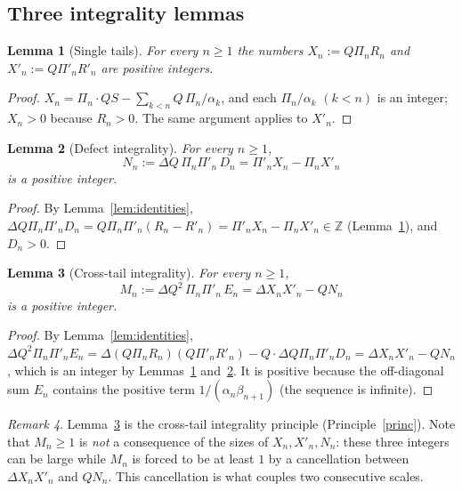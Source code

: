 \documentclass[11pt]{amsart}
\newtheorem{lemma}{Lemma}[section]
\theoremstyle{definition}
\theoremstyle{remark}
\newtheorem{remark}[lemma]{Remark}
\newcommand{\Z}{\mathbb{Z}}
\begin{document}
\subsection{Three integrality lemmas}

\begin{lemma}[Single tails]\label{lem:single}
For every $n\ge1$ the numbers $X_n:=Q\Pi_nR_n$ and $X'_n:=Q\Pi'_nR'_n$ are positive
integers.
\end{lemma}

\begin{proof}
$X_n=\Pi_n\cdot QS-\sum_{k<n}Q\,\Pi_n/\alpha_k$, and each $\Pi_n/\alpha_k$ $(k<n)$ is an
integer; $X_n>0$ because $R_n>0$. The same argument applies to $X'_n$.
\end{proof}

\begin{lemma}[Defect integrality]\label{lem:defect}
For every $n\ge1$,
\[
N_n:=\Delta Q\,\Pi_n\Pi'_n\,D_n=\Pi'_nX_n-\Pi_nX'_n
\]
is a positive integer.
\end{lemma}

\begin{proof}
By Lemma~\ref{lem:identities},
$\Delta Q\Pi_n\Pi'_nD_n=Q\Pi_n\Pi'_n(R_n-R'_n)=\Pi'_nX_n-\Pi_nX'_n\in\Z$
(Lemma~\ref{lem:single}), and $D_n>0$.
\end{proof}

\begin{lemma}[Cross-tail integrality]\label{lem:cross}
For every $n\ge1$,
\[
M_n:=\Delta Q^2\,\Pi_n\Pi'_n\,E_n=\Delta X_nX'_n-QN_n
\]
is a positive integer.
\end{lemma}

\begin{proof}
By Lemma~\ref{lem:identities},
$\Delta Q^2\Pi_n\Pi'_nE_n=\Delta(Q\Pi_nR_n)(Q\Pi'_nR'_n)-Q\cdot\Delta Q\Pi_n\Pi'_nD_n
=\Delta X_nX'_n-QN_n$, which is an integer by Lemmas~\ref{lem:single}
and~\ref{lem:defect}. It is positive because the off-diagonal sum $E_n$ contains the
positive term $1/(\alpha_n\beta_{n+1})$ (the sequence is infinite).
\end{proof}

\begin{remark}
Lemma~\ref{lem:cross} is the cross-tail integrality principle
(Principle~\ref{princ}). Note that $M_n\ge1$ is \emph{not} a consequence of the sizes of
$X_n,X'_n,N_n$: these three integers can be large while $M_n$ is forced to be at least
$1$ by a cancellation between $\Delta X_nX'_n$ and $QN_n$. This cancellation is what
couples two consecutive scales.
\end{remark}
\end{document}
